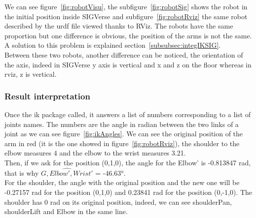 We can see figure~\ref{fig:robotVisu}, the subfigure~\ref{fig:robotSig} shows the robot in the initial position inside SIGVerse and subfigure~\ref{fig:robotRviz} the same robot described by the urdf file viewed thanks to RViz. The robots have the same proportion but one difference is obvious, the position of the arms is not the same. A solution to this problem is explained section~\ref{subsubsec:integIKSIG}.\\
Between these two robots, another difference can be noticed, the orientation of the axis, indeed in SIGVerse y axis is vertical and x and z on the floor whereas in rviz, z is vertical.

\subsubsection{Result interpretation}
Once the ik package called, it answers a list of numbers corresponding to a list of joints names. The numbers are the angle in radian between the two links of a joint as we can see figure~\ref{fig:ikAngles}.
We can see the original position of the arm in red (it is the one showed in figure~\ref{fig:robotRviz}), the shoulder to the elbow measures 4 and the elbow to the wrist measures 3.21.\\
Then, if we ask for the position (0,1,0), the angle for the Elbow' is -0.813847 rad, that is why $\widehat{G,Elbow',Wrist'}$ = -46.63°.\\
For the shoulder, the angle with the original position and the new one will be -0.27157 rad for the position (0,1,0) and 0.23841 rad for the position (0,-1,0). The shoulder has 0 rad on its original position, indeed, we can see shoulderPan, shoulderLift and Elbow in the same line.

\noindent\begin{minipage}{\linewidth}%
\label{fig:ikAngles}%
\end{minipage}

